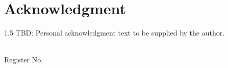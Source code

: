 \chapter*{Acknowledgment}
\thispagestyle{plain}
\begin{spacing}{1.5}
TBD: Personal acknowledgment text to be supplied by the author.
\vspace{2cm}
\begin{flushright}\StudentName\\Register No. \RegisterNumber\end{flushright}
\end{spacing}
\clearpage
